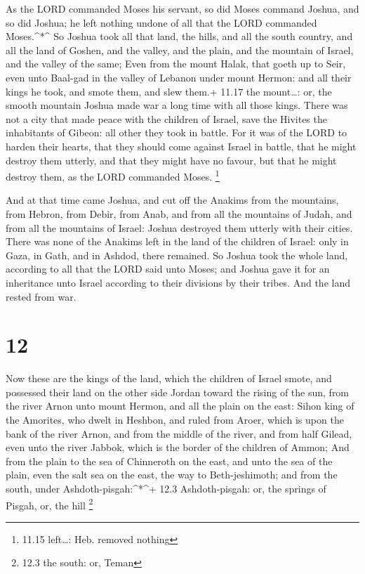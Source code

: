  As the LORD commanded Moses his servant, so did Moses
command Joshua, and so did Joshua; he left nothing undone of all that
the LORD commanded Moses.\^{}*\^{}  So Joshua took all that
land, the hills, and all the south country, and all the land of Goshen,
and the valley, and the plain, and the mountain of Israel, and the
valley of the same;  Even from the mount Halak, that goeth
up to Seir, even unto Baal-gad in the valley of Lebanon under mount
Hermon: and all their kings he took, and smote them, and slew them.+
11.17 the mount\ldots: or, the smooth mountain  Joshua made
war a long time with all those kings.  There was not a city
that made peace with the children of Israel, save the Hivites the
inhabitants of Gibeon: all other they took in battle.  For
it was of the LORD to harden their hearts, that they should come against
Israel in battle, that he might destroy them utterly, and that they
might have no favour, but that he might destroy them, as the LORD
commanded Moses. \footnote{11.15 left\ldots: Heb. removed nothing}

 And at that time came Joshua, and cut off the Anakims from
the mountains, from Hebron, from Debir, from Anab, and from all the
mountains of Judah, and from all the mountains of Israel: Joshua
destroyed them utterly with their cities.  There was none
of the Anakims left in the land of the children of Israel: only in Gaza,
in Gath, and in Ashdod, there remained.  So Joshua took the
whole land, according to all that the LORD said unto Moses; and Joshua
gave it for an inheritance unto Israel according to their divisions by
their tribes. And the land rested from war.

\hypertarget{section-11}{%
\section{12}\label{section-11}}

 Now these are the kings of the land, which the children of
Israel smote, and possessed their land on the other side Jordan toward
the rising of the sun, from the river Arnon unto mount Hermon, and all
the plain on the east:  Sihon king of the Amorites, who
dwelt in Heshbon, and ruled from Aroer, which is upon the bank of the
river Arnon, and from the middle of the river, and from half Gilead,
even unto the river Jabbok, which is the border of the children of
Ammon;  And from the plain to the sea of Chinneroth on the
east, and unto the sea of the plain, even the salt sea on the east, the
way to Beth-jeshimoth; and from the south, under
Ashdoth-pisgah:\^{}*\^{}+ 12.3 Ashdoth-pisgah: or, the springs of
Pisgah, or, the hill \footnote{12.3 the south: or, Teman}

